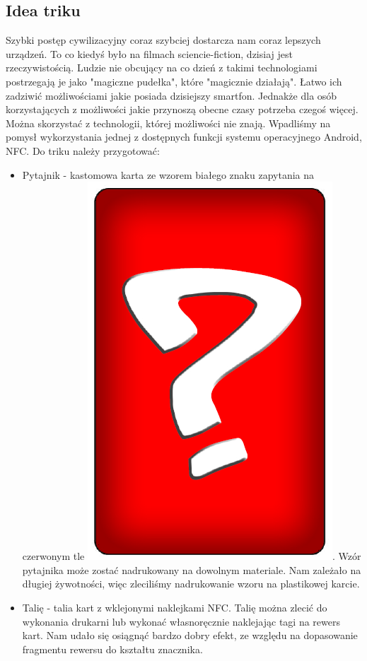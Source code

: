 \subsection{Idea triku}
Szybki postęp cywilizacyjny coraz szybciej dostarcza nam coraz lepszych urządzeń. To co kiedyś było na filmach sciencie-fiction, dzisiaj jest rzeczywistością. Ludzie nie obcujący na co dzień z takimi technologiami postrzegają je jako "magiczne pudełka", które "magicznie działają". Łatwo ich zadziwić możliwościami jakie posiada dzisiejszy smartfon. Jednakże dla osób korzystających z możliwości jakie przynoszą obecne czasy potrzeba czegoś więcej. Można skorzystać z technologii, której możliwości nie znają. Wpadliśmy na pomysł wykorzystania jednej z dostępnych funkcji systemu operacyjnego Android, NFC. Do triku należy przygotować:
\begin{itemize}
    \item Pytajnik - kastomowa karta ze wzorem białego znaku zapytania na czerwonym tle
\includegraphics[scale=0.04]{imgs/pytajnik.PNG}. Wzór pytajnika może zostać nadrukowany na dowolnym materiale. Nam zależało na długiej żywotności, więc zleciliśmy nadrukowanie wzoru na plastikowej karcie.
    \item Talię - talia kart z wklejonymi naklejkami NFC. Talię można zlecić do wykonania drukarni lub wykonać własnoręcznie naklejając tagi na rewers kart. Nam udało się osiągnąć bardzo dobry efekt, ze względu na dopasowanie fragmentu rewersu do kształtu znacznika.

\end{itemize}
